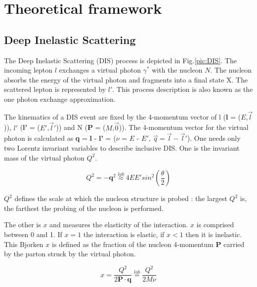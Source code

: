 
\chapter{Theoretical framework} %

\label{ch:thfw} %


\section{Deep Inelastic Scattering}

The Deep Inelastic Scattering (DIS) process is depicted in Fig.\ref{pic:DIS}. The incoming lepton $l$ exchanges
a virtual photon $\gamma^*$ with the nucleon $N$. The nucleon absorbs the energy of the virtual photon and fragments
into a final state X. The scattered lepton is represented by $l'$. This process description is also known as the
one photon exchange approximation.


The kinematics of a DIS event are fixed by the 4-momentum vector of l (\textbf{l} = ($E$,$\vec{l}$)), $l'$ (\textbf{l'} = ($E'$,$\vec{l}'$))
and N (\textbf{P} = ($M$,$\vec{0}$)). The 4-momentum vector for the virtual photon is calculated as \textbf{q} = \textbf{l} - \textbf{l'} =
($\nu$ = $E$ - $E'$, $\vec{q}=\vec{l}-\vec{l}'$). One needs only two Lorentz invariant variables to describe
inclusive DIS. One is the invariant mass of the virtual photon $Q^2$.

\begin{equation}
  Q^2 = -\textbf{q}^2 \stackrel{lab}{\approx} 4EE'sin^2(\frac{\theta}{2})
\end{equation}

$Q^2$ defines the scale at which the nucleon structure is probed : the largest $Q^2$ is, the farthest the probing
of the nucleon is performed.

The other is $x$ and measures the elasticity of the interaction. $x$ is comprised between 0 and 1. If $x=1$ the
interaction is elastic, if $x<1$ then it is inelastic. This Bjorken\cite{Bjorken} $x$ is defined as the fraction
of the nucleon 4-momentum \textbf{P} carried by the parton struck by the virtual photon.

\begin{equation}
  x = \frac{Q^2}{2\textbf{P}\cdot\textbf{q}} \stackrel{lab}{=} \frac{Q^2}{2M\nu}
\end{equation}

